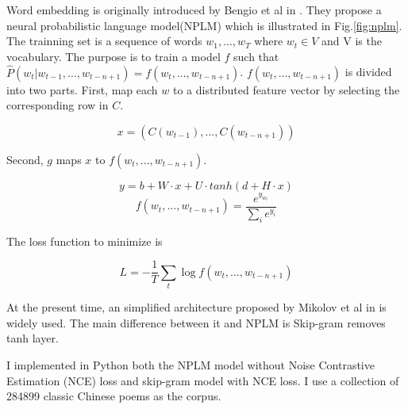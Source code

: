 \documentclass[12pt]{article}
\begin{document}
Word embedding is originally introduced by  Bengio et al in \cite{bengio2003neural}. They propose a neural probabilistic language model(NPLM) which is illustrated in Fig.\ref{fig:nplm}. The trainning set is a sequence of words $w_1,...,w_T$ where $w_t \in V$ and V is the vocabulary. The purpose is to train a model $f$ such that $ \hat{P}(w_t | w_{t-1},...,w_{t-n+1}) = f(w_t, ..., w_{t-n+1})$. $f(w_t, ..., w_{t-n+1})$ is divided into two parts.
First, map each $w$ to a distributed feature vector by selecting the corresponding row in $C$.

$$x=(C(w_{t-1}),... ,C(w_{t-n+1}))$$

Second, $g$ maps $x$ to $f(w_t, ..., w_{t-n+1})$.


$$y=b+W\cdot x + U\cdot tanh(d + H\cdot x)$$
$$ f(w_t, ..., w_{t-n+1}) = \frac{e^{y_{w_t}}}{\sum_{i}^{}e^{y_i}}$$

The loss function to minimize is

$$L = -\frac{1}{T}\sum _{t}^{} \log{f(w_t, ..., w_{t-n+1})}$$


At the present time, an simplified architecture proposed by Mikolov et al in \cite{mikolov2013efficient} is widely used. The main difference between it and NPLM is Skip-gram removes tanh layer.

I implemented in Python both the NPLM model without Noise Contrastive Estimation (NCE) loss and skip-gram model with NCE loss. I use a collection of 284899 classic Chinese poems as the corpus.
\end{document}
